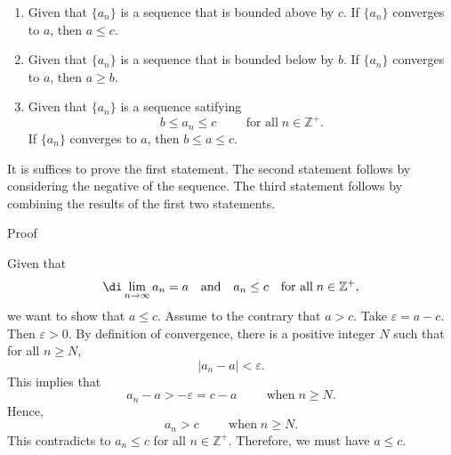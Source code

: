 \begin{lemma}[label=23020406]{}
\begin{enumerate}[1.]
\item
Given that $\{a_n\}$ is a sequence that is bounded above by $c$. If  $\{a_n\}$ converges to $a$, then $a\leq c$. 
\item 
Given that $\{a_n\}$ is a sequence that is bounded below by $b$. If  $\{a_n\}$ converges to $a$, then $a\geq b$. 
\item Given that $\{a_n\}$ is a sequence satifying
\[b\leq a_n\leq c\hspace{1cm}\text{for all}\; n\in\mathbb{Z}^+.\]If  $\{a_n\}$ converges to $a$, then $b\leq a\leq c$.
\end{enumerate}
\end{lemma}
It is suffices to prove the first statement. The second statement follows by considering the negative of the sequence. The third statement follows by combining the results of the first two statements.
\begin{myproof}{Proof}


Given that \[\di\lim_{n\rightarrow\infty}a_n=a\quad\text{and}\quad a_n\leq c \quad \text{for all}\;n\in\mathbb{Z}^+,\] we want to show that $a\leq c$. Assume to the contrary that $a>c$. Take $\varepsilon=a-c$. Then $\varepsilon>0$. By definition of convergence, there is a positive integer $N$ such that for all $n\geq N$,
\[|a_n-a|<\varepsilon.\]
This implies that
\[a_n-a>-\varepsilon=c-a\hspace{1cm}\text{when}\;n\geq N.\]
Hence,
\[a_n>c\hspace{1cm}\text{when}\;n\geq N.\]This contradicts to $a_n\leq c$ for all $n\in\mathbb{Z}^+$.
Therefore, we must have $a\leq c$.

\end{myproof}
 


